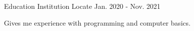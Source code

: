 

\begin{cventries}

  \cventry
    {Education} %
    {Institution} %
    {Locate} %
    {Jan. 2020 - Nov. 2021} %
    {
      \begin{cvitems} %
        \item {Gives me experience with programming and computer basics.}
      \end{cvitems}
    }

\end{cventries}

